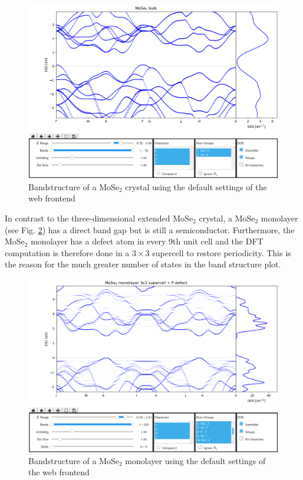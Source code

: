 \begin{figure}[htb!]
    \centering
    \includegraphics[width=1.0\linewidth]{img/gui_web_mose2_crystal.png}
    \caption[Bandstructure of a $\textrm{MoSe}_2$ crystal]{Bandstructure of a $\textrm{MoSe}_2$ crystal using the default settings of the web frontend}
    \label{example1}
\end{figure}

In contrast to the three-dimensional extended $\textrm{MoSe}_2$ crystal, a $\textrm{MoSe}_2$ monolayer (see Fig. \ref{example2}) has a direct band gap but is still a semiconductor. Furthermore, the $\textrm{MoSe}_2$ monolayer has a defect atom in every 9th unit cell and the DFT computation is therefore done in a $3 \times 3$ supercell to restore periodicity. This is the reason for the much greater number of states in the band structure plot. 

\begin{figure}[htb!]
    \centering
    \includegraphics[width=1.0\linewidth]{img/gui_web_mose2_monolayer_unfold-1.png}
    \caption[Bandstructure of a $\textrm{MoSe}_2$ monolayer]{Bandstructure of a $\textrm{MoSe}_2$ monolayer using the default settings of the web frontend}
    \label{example2}
\end{figure}

